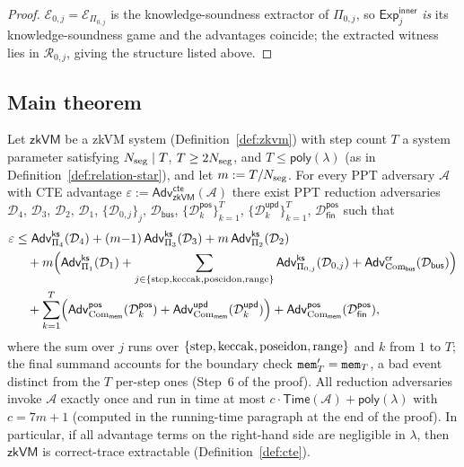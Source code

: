 \begin{proof}
$\mathcal{E}_{0,j}=\mathcal{E}_{\Pi_{0,j}}$ is the knowledge-soundness extractor
of $\Pi_{0,j}$, so $\mathsf{Exp}^{\mathsf{inner}}_{j}$ \emph{is} its
knowledge-soundness game and the advantages coincide; the extracted witness
lies in $\mathcal{R}_{0,j}$, giving the structure listed above.
\end{proof}

\subsection{Main theorem}\label{sec:security:thm}

\begin{theorem}\label{thm:main}
Let $\mathsf{zkVM}$ be a zkVM system (Definition~\ref{def:zkvm}) with step count
$T$ a system parameter satisfying $N_{\mathrm{seg}}\mid T$, $T\ge 2N_{\mathrm{seg}}$, and
$T\le\mathsf{poly}(\lambda)$ (as in Definition~\ref{def:relation-star}),
and let $m := T/N_{\mathrm{seg}}$.
For every PPT adversary $\mathcal{A}$ with CTE advantage
$\varepsilon := \mathsf{Adv}^{\mathsf{cte}}_{\mathsf{zkVM}}(\mathcal{A})$
there exist PPT reduction adversaries
$\mathcal{D}_4$, $\mathcal{D}_3$, $\mathcal{D}_2$,
$\mathcal{D}_1$, $\{\mathcal{D}_{0,j}\}_{j}$, $\mathcal{D}_{\mathsf{bus}}$,
$\{\mathcal{D}^{\mathsf{pos}}_k\}_{k=1}^{T}$, $\{\mathcal{D}^{\mathsf{upd}}_k\}_{k=1}^{T}$,
$\mathcal{D}^{\mathsf{pos}}_{\mathsf{fin}}$
such that
\begin{align}\label{eq:cte-bound}
  \varepsilon &\leq
  \mathsf{Adv}^{\mathsf{ks}}_{\Pi_4}(\mathcal{D}_4)
  + (m{-}1)\,\mathsf{Adv}^{\mathsf{ks}}_{\Pi_3}(\mathcal{D}_3)
  + m\,\mathsf{Adv}^{\mathsf{ks}}_{\Pi_2}(\mathcal{D}_2) \nonumber\\
  &\quad
  + m\Bigl(
    \mathsf{Adv}^{\mathsf{ks}}_{\Pi_1}(\mathcal{D}_1)
    + \sum_{j\in\{\mathrm{step},\mathrm{keccak},\mathrm{poseidon},\mathrm{range}\}}\mathsf{Adv}^{\mathsf{ks}}_{\Pi_{0,j}}(\mathcal{D}_{0,j})
    + \mathsf{Adv}^{\mathsf{cr}}_{\mathrm{Com}_{\mathsf{bus}}}(\mathcal{D}_{\mathsf{bus}})
  \Bigr) \nonumber\\
  &\quad
  + \sum_{k=1}^{T}\Bigl(
    \mathsf{Adv}^{\mathsf{pos}}_{\mathrm{Com}_{\mathsf{mem}}}(\mathcal{D}^{\mathsf{pos}}_k)
    + \mathsf{Adv}^{\mathsf{upd}}_{\mathrm{Com}_{\mathsf{mem}}}(\mathcal{D}^{\mathsf{upd}}_k)
  \Bigr)
  + \mathsf{Adv}^{\mathsf{pos}}_{\mathrm{Com}_{\mathsf{mem}}}(\mathcal{D}^{\mathsf{pos}}_{\mathsf{fin}}),
\end{align}
where the sum over $j$ runs over $\{\mathrm{step},\mathrm{keccak},\mathrm{poseidon},\mathrm{range}\}$ and $k$ from $1$ to $T$;
the final summand accounts for the boundary check $\mathtt{mem}_T'=\mathtt{mem}_T$, a bad event
distinct from the $T$ per-step ones (Step~6 of the proof).
All reduction adversaries invoke $\mathcal{A}$ exactly once and run in time at
most $c\cdot\mathsf{Time}(\mathcal{A})+\mathsf{poly}(\lambda)$ with $c = 7m+1$
(computed in the running-time paragraph at the end of the proof).
In particular, if all advantage terms on the right-hand side are negligible in $\lambda$,
then $\mathsf{zkVM}$ is correct-trace extractable (Definition~\ref{def:cte}).
\end{theorem}

